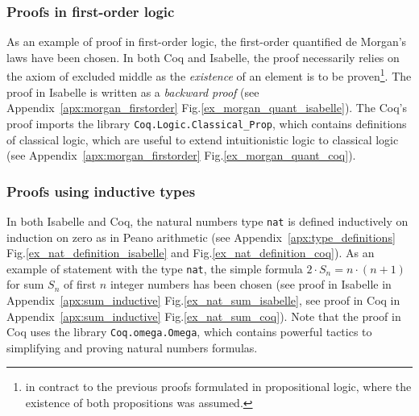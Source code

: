 \documentclass[article]{aaltoseries}
\begin{document}
\subsubsection{Proofs in first-order logic}

As an example of proof in first-order logic, the first-order quantified de Morgan's laws have been chosen. In both Coq and Isabelle, the proof necessarily relies on the axiom of excluded middle as the \textit{existence} of an element is to be proven\footnote{in contract to the previous proofs formulated in propositional logic, where the existence of both propositions was assumed.}. The proof in Isabelle is written as a \textit{backward proof} (see Appendix~\ref{apx:morgan_firstorder} Fig.\ref{ex_morgan_quant_isabelle}). The Coq's proof imports the library \texttt{Coq.Logic.Classical\_Prop}, which contains definitions of classical logic, which are useful to extend intuitionistic logic to classical logic (see Appendix~\ref{apx:morgan_firstorder} Fig.\ref{ex_morgan_quant_coq}).





\subsubsection{Proofs using inductive types}

In both Isabelle and Coq, the natural numbers type \texttt{nat} is defined inductively on induction on zero as in Peano arithmetic (see Appendix~\ref{apx:type_definitions} Fig.\ref{ex_nat_definition_isabelle} and Fig.\ref{ex_nat_definition_coq}). As an example of statement with the type \texttt{nat}, the simple formula 
$2 \cdot S_{n} = {n \cdot (n + 1)}$ for sum $S_{n}$ of first $n$ integer numbers has been chosen (see proof in Isabelle in Appendix~\ref{apx:sum_inductive} Fig.\ref{ex_nat_sum_isabelle}, see proof in Coq in Appendix~\ref{apx:sum_inductive} Fig.\ref{ex_nat_sum_coq}). Note that the proof in Coq uses the library \texttt{Coq.omega.Omega}, which contains powerful tactics to simplifying and proving natural numbers formulas.
\end{document}
